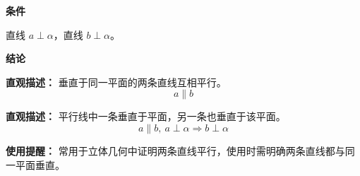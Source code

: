 \begin{statementbox}
	\textbf{\textcolor{CStatement}{条件}}
	\begin{description}[style=nextline, leftmargin=2.8em, labelsep=0.5em, itemsep=0.35em]
		\item[\textbf{\textcolor{CStatement}{条件1（线面垂直条件）：}}] 直线 $a\perp\alpha$，直线 $b\perp\alpha$。
	\end{description}

	\textbf{\textcolor{CStatement}{结论}}
	\begin{description}[style=nextline, leftmargin=2.8em, labelsep=0.5em, itemsep=0.45em]
		\item[\textbf{\textcolor{CStatement}{结论一（两直线平行）：}}]
			\textbf{\textcolor{CStatement}{直观描述：}}
			垂直于同一平面的两条直线互相平行。
			\[
				a\parallel b
			\]
		\item[\textbf{\textcolor{CStatement}{推广结论（平行则垂直）：}}]
			\textbf{\textcolor{CStatement}{直观描述：}}
			平行线中一条垂直于平面，另一条也垂直于该平面。
			\[
				a\parallel b,\ a\perp\alpha \Rightarrow b\perp\alpha
			\]
	\end{description}

	\textbf{\textcolor{CStatement}{使用提醒：}}
	常用于立体几何中证明两条直线平行，使用时需明确两条直线都与同一平面垂直。
\end{statementbox}
